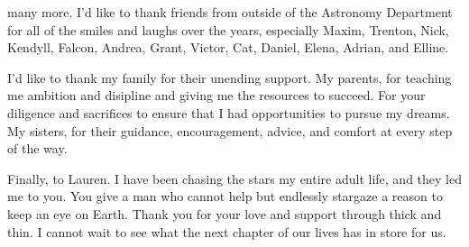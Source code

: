 \documentclass[main.tex]{subfiles}
\begin{document}
\begin{doublespace}
many more.
I'd like to thank friends from outside of the Astronomy Department for all of
the smiles and laughs over the years, especially Maxim, Trenton, Nick, Kendyll,
Falcon, Andrea, Grant, Victor, Cat, Daniel, Elena, Adrian, and Elline.
\par
I'd like to thank my family for their unending support.
My parents, for teaching me ambition and disipline and giving me the resources
to succeed.
For your diligence and sacrifices to ensure that I had opportunities to pursue
my dreams.
My sisters, for their guidance, encouragement, advice, and comfort at every
step of the way.
\par
Finally, to Lauren.
I have been chasing the stars my entire adult life, and they led me to you.
You give a man who cannot help but endlessly stargaze a reason to keep an
eye on Earth.
Thank you for your love and support through thick and thin.
I cannot wait to see what the next chapter of our lives has in store for us.

\end{doublespace}
\end{document}
